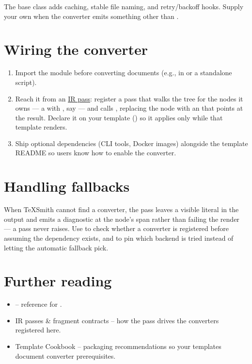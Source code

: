 \documentclass[a4paper,twoside]{article}
\begin{document}
The base class adds caching, stable file naming, and retry/backoff hooks. Supply
your own  when the converter emits something other than .
\section{Wiring the converter}
\begin{enumerate}
\item Import the module before converting documents (e.g., in 
or a standalone script).
\item Reach it from an \href{handlers.md\#ir-passes}{IR pass}: register a  pass that
walks the tree for the nodes it owns --- a  with ,
say --- and calls , replacing the node with an
 that points at the result. Declare it on your template
() so it applies only while that template
renders.
\item Ship optional dependencies (CLI tools, Docker images) alongside the template
README so users know how to enable the converter.
\end{enumerate}
\section{Handling fallbacks}
When TeXSmith cannot find a converter, the  pass leaves a visible
literal in the output and emits a diagnostic at the node's span rather than
failing the render --- a pass never raises. Use
 to check whether a
converter is registered before assuming the dependency exists, and
 to pin which backend is tried
instead of letting the automatic fallback pick.
\section{Further reading}
\begin{itemize}
\item {} -- reference for
.
\item IR passes \& fragment contracts -- how the 
pass drives the converters registered here.
\item Template Cookbook -- packaging
recommendations so your templates document converter prerequisites.
\end{itemize}
\end{document}
